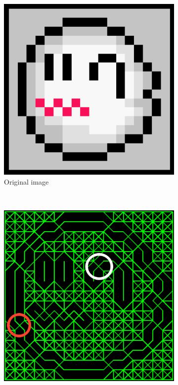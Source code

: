 \documentclass{article}
\begin{document}
\begin{figure}
    \centering
    \begin{subfigure}[b]{0.3\textwidth}
        \includegraphics[width=\textwidth]{3}
        \caption{Original image}
        \label{fig:gull}
    \end{subfigure}
    ~ %
    \begin{subfigure}[b]{0.3\textwidth}
        \includegraphics[width=\textwidth]{22}

\end{subfigure}
\end{figure}
\end{document}
